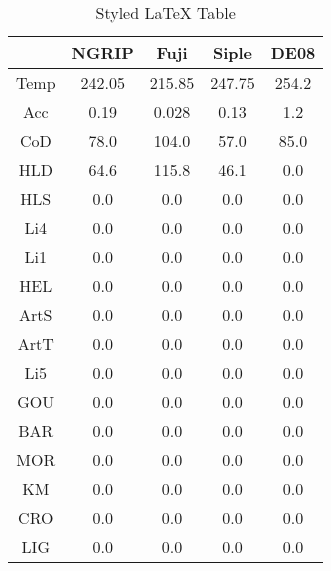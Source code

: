 \begin{table}[h]
\centering
\caption{Styled LaTeX Table}
\label{table:5}
\begin{tabular}{ccccc}
\toprule
 & NGRIP & Fuji & Siple & DE08 \\
\midrule
Temp & 242.05 & 215.85 & 247.75 & 254.2 \\
Acc & 0.19 & 0.028 & 0.13 & 1.2 \\
CoD & 78.0 & 104.0 & 57.0 & 85.0 \\
HLD & 64.6 & 115.8 & 46.1 & 0.0 \\
HLS & 0.0 & 0.0 & 0.0 & 0.0 \\
Li4 & 0.0 & 0.0 & 0.0 & 0.0 \\
Li1 & 0.0 & 0.0 & 0.0 & 0.0 \\
HEL & 0.0 & 0.0 & 0.0 & 0.0 \\
ArtS & 0.0 & 0.0 & 0.0 & 0.0 \\
ArtT & 0.0 & 0.0 & 0.0 & 0.0 \\
Li5 & 0.0 & 0.0 & 0.0 & 0.0 \\
GOU & 0.0 & 0.0 & 0.0 & 0.0 \\
BAR & 0.0 & 0.0 & 0.0 & 0.0 \\
MOR & 0.0 & 0.0 & 0.0 & 0.0 \\
KM & 0.0 & 0.0 & 0.0 & 0.0 \\
CRO & 0.0 & 0.0 & 0.0 & 0.0 \\
LIG & 0.0 & 0.0 & 0.0 & 0.0 \\
\bottomrule
\end{tabular}
\end{table}
